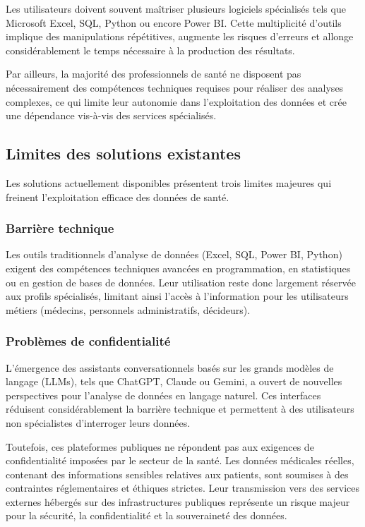 Les utilisateurs doivent souvent maîtriser plusieurs logiciels spécialisés tels que Microsoft Excel, SQL, Python ou encore Power BI. Cette multiplicité d'outils implique des manipulations répétitives, augmente les risques d'erreurs et allonge considérablement le temps nécessaire à la production des résultats.

Par ailleurs, la majorité des professionnels de santé ne disposent pas nécessairement des compétences techniques requises pour réaliser des analyses complexes, ce qui limite leur autonomie dans l'exploitation des données et crée une dépendance vis-à-vis des services spécialisés.

\subsection{Limites des solutions existantes}

Les solutions actuellement disponibles présentent trois limites majeures qui freinent l'exploitation efficace des données de santé.

\subsubsection*{Barrière technique}

Les outils traditionnels d'analyse de données (Excel, SQL, Power BI, Python) exigent des compétences techniques avancées en programmation, en statistiques ou en gestion de bases de données. Leur utilisation reste donc largement réservée aux profils spécialisés, limitant ainsi l'accès à l'information pour les utilisateurs métiers (médecins, personnels administratifs, décideurs).

\subsubsection*{Problèmes de confidentialité}

L'émergence des assistants conversationnels basés sur les grands modèles de langage (LLMs), tels que ChatGPT, Claude ou Gemini, a ouvert de nouvelles perspectives pour l'analyse de données en langage naturel. Ces interfaces réduisent considérablement la barrière technique et permettent à des utilisateurs non spécialistes d'interroger leurs données.

Toutefois, ces plateformes publiques ne répondent pas aux exigences de confidentialité imposées par le secteur de la santé. Les données médicales réelles, contenant des informations sensibles relatives aux patients, sont soumises à des contraintes réglementaires et éthiques strictes. Leur transmission vers des services externes hébergés sur des infrastructures publiques représente un risque majeur pour la sécurité, la confidentialité et la souveraineté des données.

